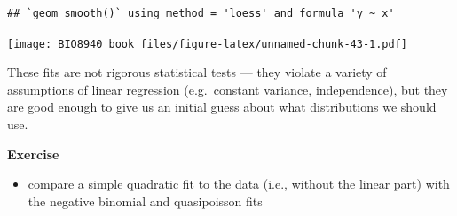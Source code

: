 \documentclass[
  12pt,
]{book}
\providecommand{\tightlist}{%
  \setlength{\itemsep}{0pt}\setlength{\parskip}{0pt}}
\begin{document}
\begin{verbatim}
## `geom_smooth()` using method = 'loess' and formula 'y ~ x'
\end{verbatim}

\texttt{[image: BIO8940\_book\_files/figure-latex/unnamed-chunk-43-1.pdf]}

These fits are not rigorous statistical tests --- they violate a variety of assumptions of linear regression (e.g.~constant variance, independence), but they are good enough to give us an initial guess about what distributions we should use.

\textbf{Exercise}

\begin{itemize}
\tightlist
\item
  compare a simple quadratic fit to the data (i.e., without the linear part) with the negative binomial and quasipoisson fits
\end{itemize}
\end{document}
